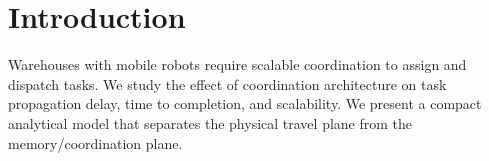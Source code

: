 \section{Introduction}
Warehouses with mobile robots require scalable coordination to assign and dispatch tasks. We study the effect of coordination architecture on task propagation delay, time to completion, and scalability. We present a compact analytical model that separates the physical travel plane from the memory/coordination plane.
